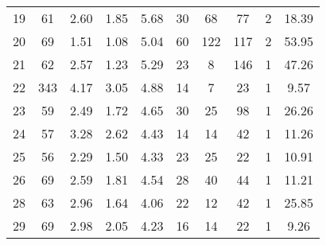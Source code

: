 \begin{tabular}{lccccccccc}
19 &       61 &                             2.60 &                             1.85 &                             5.68 &              30 &              68 &                        77 &          2 &                        18.39 \\
20 &       69 &                             1.51 &                             1.08 &                             5.04 &              60 &             122 &                       117 &          2 &                        53.95 \\
21 &       62 &                             2.57 &                             1.23 &                             5.29 &              23 &               8 &                       146 &          1 &                        47.26 \\
22 &      343 &                             4.17 &                             3.05 &                             4.88 &              14 &               7 &                        23 &          1 &                         9.57 \\
23 &       59 &                             2.49 &                             1.72 &                             4.65 &              30 &              25 &                        98 &          1 &                        26.26 \\
24 &       57 &                             3.28 &                             2.62 &                             4.43 &              14 &              14 &                        42 &          1 &                        11.26 \\
25 &       56 &                             2.29 &                             1.50 &                             4.33 &              23 &              25 &                        22 &          1 &                        10.91 \\
26 &       69 &                             2.59 &                             1.81 &                             4.54 &              28 &              40 &                        44 &          1 &                        11.21 \\
28 &       63 &                             2.96 &                             1.64 &                             4.06 &              22 &              12 &                        42 &          1 &                        25.85 \\
29 &       69 &                             2.98 &                             2.05 &                             4.23 &              16 &              14 &                        22 &          1 &                         9.26 \\

\end{tabular}
